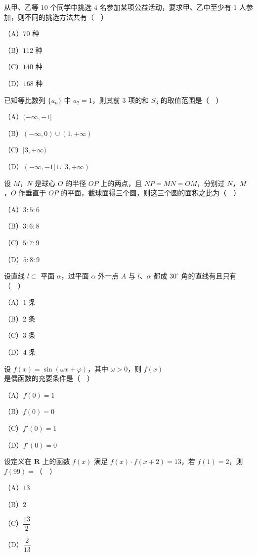 \begin{question}
从甲、乙等 $10$ 个同学中挑选 $4$ 名参加某项公益活动，要求甲、乙中至少有 $1$ 人参加，则不同的挑选方法共有（　）

（A）$70$ 种

（B）$112$ 种

（C）$140$ 种

（D）$168$ 种

\end{question}
\begin{question}
已知等比数列 $\{a_n\}$ 中 $a_2=1$，则其前 $3$ 项的和 $S_3$ 的取值范围是（　）

（A）$(-\infty,-1]$

（B）$(-\infty,0)\cup(1,+\infty)$

（C）$[3,+\infty)$

（D）$(-\infty,-1]\cup[3,+\infty)$

\end{question}
\begin{question}
设 $M$，$N$ 是球心 $O$ 的半径 $OP$ 上的两点，且 $NP=MN=OM$，分别过 $N$，$M$，$O$ 作垂直于 $OP$ 的平面，截球面得三个圆，则这三个圆的面积之比为（　）

（A）$3:5:6$

（B）$3:6:8$

（C）$5:7:9$

（D）$5:8:9$

\end{question}
\begin{question}
设直线 $l\subset$ 平面 $\alpha$，过平面 $\alpha$ 外一点 $A$ 与 $l$、$\alpha$ 都成 $30^\circ$ 角的直线有且只有（　）

（A）$1$ 条

（B）$2$ 条

（C）$3$ 条

（D）$4$ 条

\end{question}
\begin{question}
设 $f(x)=\sin(\omega x+\varphi)$，其中 $\omega>0$，则 $f(x)$ 是偶函数的充要条件是（　）

（A）$f(0)=1$

（B）$f(0)=0$

（C）$f'(0)=1$

（D）$f'(0)=0$

\end{question}
\begin{question}
设定义在 $\mathbf R$ 上的函数 $f(x)$ 满足 $f(x)\cdot f(x+2)=13$，若 $f(1)=2$，则 $f(99)=$（　）

（A）$13$

（B）$2$

（C）$\dfrac{13}2$

（D）$\dfrac2{13}$

\end{question}
